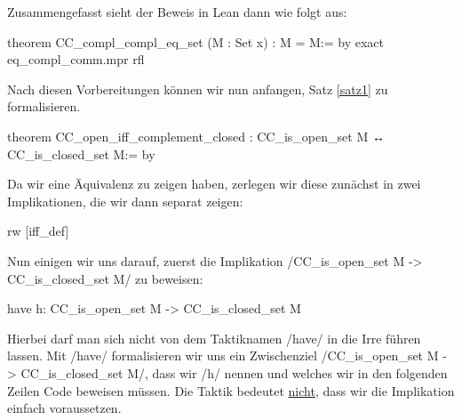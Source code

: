 \documentclass[10pt]{article}
\begin{document}
\noindent Zusammengefasst sieht der Beweis in Lean dann wie folgt aus:
\begin{leancode}
theorem CC_compl_compl_eq_set (M : Set x) : M = M\compl\compl := by
  exact eq_compl_comm.mpr rfl
\end{leancode}
\noindent Nach diesen Vorbereitungen können wir nun anfangen, Satz \ref{satz1} zu formalisieren.
\begin{leancode}
theorem CC_open_iff_complement_closed :
 CC_is_open_set M ↔ CC_is_closed_set M\compl := by
\end{leancode}
\noindent Da wir eine Äquivalenz zu zeigen haben, zerlegen wir diese zunächst in zwei Implikationen, die wir dann separat zeigen:
\begin{leancode}
  rw [iff_def]
\end{leancode}
\noindent Nun einigen wir uns darauf, zuerst die Implikation \lean/CC_is_open_set M -> CC_is_closed_set M\compl/ zu beweisen:
\begin{leancode}
  have h: CC_is_open_set M -> CC_is_closed_set M\compl 
\end{leancode}
\noindent Hierbei darf man sich nicht von dem Taktiknamen \lean/have/ in die Irre führen lassen. Mit \lean/have/ formalisieren wir uns ein Zwischenziel \lean/CC_is_open_set M -> CC_is_closed_set M\compl/, dass wir \lean/h/ nennen und welches wir in den folgenden Zeilen Code beweisen müssen. Die Taktik bedeutet \underline{nicht}, dass wir die Implikation einfach voraussetzen.\par
\end{document}
